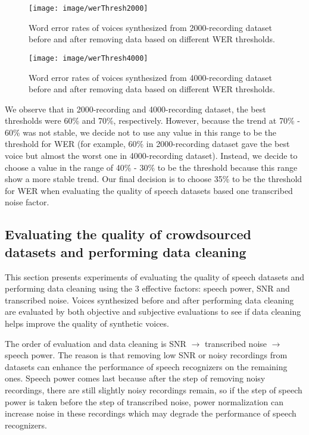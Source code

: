 \documentclass[12pt]{article}
\begin{document}
\begin{figure}[t]
\begin{center}
\texttt{[image: image/werThresh2000]}
\end{center}
\vspace{-0.3cm}
\caption[WER thresholds 2000.]{Word error rates of voices synthesized from 2000-recording dataset before and after removing data based on different WER thresholds.}
\label{fig_werThresh2000}
\end{figure}

\begin{figure}[t]
\begin{center}
\texttt{[image: image/werThresh4000]}
\end{center}
\vspace{-0.3cm}
\caption[WER thresholds 4000.]{Word error rates of voices synthesized from 4000-recording dataset before and after removing data based on different WER thresholds.}
\label{fig_werThresh4000}
\end{figure}

We observe that in 2000-recording and 4000-recording dataset, the best thresholds were 60\% and 70\%, respectively. However, because the trend at 70\% - 60\% was not stable, we decide not to use any value in this range to be the threshold for WER (for example, 60\% in 2000-recording dataset gave the best voice but almost the worst one in 4000-recording dataset).  Instead, we decide to choose a value in the range of 40\% - 30\% to be the threshold because this range show a more stable trend. Our final decision is to choose 35\% to be the threshold for WER when evaluating the quality of speech datasets based one transcribed noise factor.

\subsection{Evaluating the quality of crowdsourced datasets and performing data cleaning}
This section presents experiments of evaluating the quality of speech datasets and performing data cleaning using the 3 effective factors: speech power, SNR and transcribed noise. Voices synthesized before and after performing data cleaning are evaluated by both objective and subjective evaluations to see if data cleaning helps improve the quality of synthetic voices.

The order of evaluation and data cleaning is SNR $\rightarrow$ transcribed noise 	$\rightarrow$ speech power. The reason is that removing low SNR or noisy recordings from datasets can enhance the performance of speech recognizers on the remaining ones. Speech power comes last because after the step of removing noisy recordings, there are still slightly noisy recordings remain, so if the step of speech power is taken before the step of transcribed noise, power normalization can increase noise in these recordings which may degrade the performance of speech recognizers.
\end{document}
